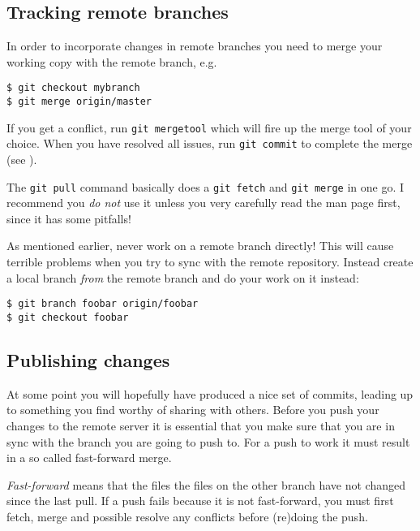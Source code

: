 \documentclass[a4paper,10pt]{article}
\begin{document}
\subsection{Tracking remote branches}
In order to incorporate changes in remote branches you need to merge your
working copy with the remote branch, e.g. 
\begin{verbatim}
$ git checkout mybranch
$ git merge origin/master 
\end{verbatim}
If you get a conflict, run
\texttt{git mergetool} which will fire up the merge tool of your choice. When
you have resolved all issues, run \texttt{git commit} to complete the merge 
(see ).

The \texttt{git pull} command basically does a \texttt{git fetch} and
\texttt{git merge} in one go. I recommend you \emph{do not} use it unless you
very carefully read the man page first, since it has some pitfalls!

As mentioned earlier, never work on a remote branch directly! This will
cause terrible problems when you try to sync with the remote repository.
Instead create a local branch \emph{from} the remote branch and do your work
on it instead: 
\begin{verbatim}
$ git branch foobar origin/foobar
$ git checkout foobar 
\end{verbatim}

\subsection{Publishing changes}
At some point you will hopefully have produced a nice set of commits, leading
up to something you find worthy of sharing with others. Before you
push your changes to the remote server it is essential that you make sure that 
you are in sync with the branch you are going to push to. For a push to work
it must result in a so called fast-forward merge.

\emph{Fast-forward} means that the files the files on
the other branch have not changed since the last pull. If a push fails
because it is not fast-forward, you must first fetch, merge and possible
resolve any conflicts before (re)doing the push.
\end{document}
